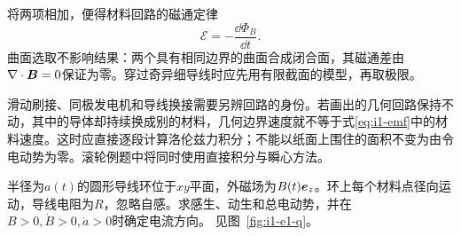 将两项相加，便得材料回路的磁通定律
\begin{equation}\label{eq:i1-flux-rule}
\boxed{\mathcal E=-\frac{\dd\Phi_B}{\dd t}}.
\end{equation}
曲面选取不影响结果：两个具有相同边界的曲面合成闭合面，其磁通差由$\nabla\cdot\bm{B}=0$保证为零。穿过奇异细导线时应先用有限截面的模型，再取极限。

滑动刷接、同极发电机和导线换接需要另辨回路的身份。若画出的几何回路保持不动，其中的导体却持续换成别的材料，几何边界速度就不等于式\eqref{eq:i1-emf}中的材料速度。这时应直接逐段计算洛伦兹力积分；不能以纸面上围住的面积不变为由令电动势为零。滚轮例题中将同时使用直接积分与瞬心方法。


\begin{example}[扩大的圆环与随时间变化的磁场]\label{ex:i1-e1}
半径为$a(t)$的圆形导线环位于$xy$平面，外磁场为$B(t)\bm{e}_z$。环上每个材料点径向运动，导线电阻为$R$，忽略自感。求感生、动生和总电动势，并在$B>0,\dot B>0,\dot a>0$时确定电流方向。 见图~\ref{fig:i1-e1-q}。
\end{example}

